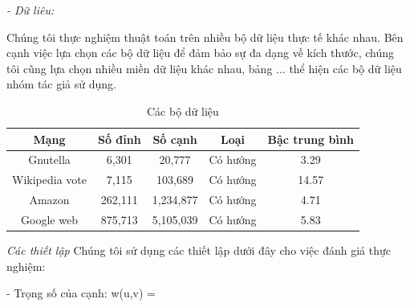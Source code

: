 		{\itshape - Dữ liêu:}
		
		 Chúng tôi thực nghiệm thuật toán trên nhiều bộ dữ liệu thực tế khác nhau. Bên cạnh việc lựa chọn các bộ dữ liệu để đảm bảo sự đa dạng về kích thước, chúng tôi cũng lựa chọn nhiều miền dữ liệu khác nhau, bảng ... thể hiện các bộ dữ liệu nhóm tác giả sử dụng.
		\begin{table}
			\centering
			\begin{tabular}{|c|c|c|c|c|}
				\hline 
				Mạng & Số đỉnh & Số cạnh & Loại & Bậc trung bình \\ 
				\hline 
				Gnutella & 6,301 & 20,777 & Có hướng & 3.29 \\ 
				\hline 
				Wikipedia vote & 7,115 & 103,689 & Có hướng & 14.57 \\ 
				\hline 
				Amazon & 262,111 & 1,234,877 & Có hướng & 4.71 \\ 
				\hline 
				Google web & 875,713 & 5,105,039 & Có hướng & 5.83 \\ 
				\hline 
			\end{tabular} 
			\caption{Các bộ dữ liệu}
		\end{table}
		
		{\itshape Các thiết lập} Chúng tôi sử dụng các thiết lập dưới đây cho việc đánh giá thực nghiệm:
		
		- Trọng số của cạnh: w(u,v) = 



